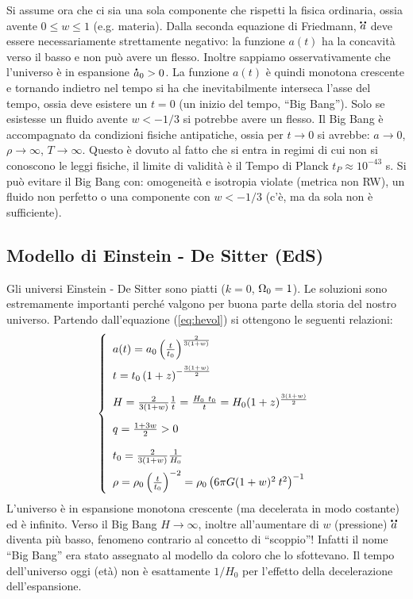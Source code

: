 Si assume ora che ci sia una sola componente che rispetti la fisica ordinaria, ossia avente $0\leq w \leq 1$ (e.g. materia). Dalla seconda equazione di Friedmann, $\accentset{\mbox{\large\bfseries ..}}{a}$ deve essere necessariamente strettamente negativo: la funzione $a(t)$ ha la concavità verso il basso e non può avere un flesso. Inoltre sappiamo osservativamente che l'universo è in espansione $\accentset{\mbox{\large\bfseries .}}{a}_0>0$. La funzione $a(t)$ è quindi monotona crescente e tornando indietro nel tempo si ha che inevitabilmente interseca l'asse del tempo, ossia deve esistere un $t=0$ (un inizio del tempo, ``Big Bang''). Solo se esistesse un fluido avente $w<-1/3$ si potrebbe avere un flesso.  Il Big Bang è accompagnato da condizioni fisiche antipatiche, ossia per $t\rightarrow 0$ si avrebbe: $a\rightarrow 0$, $\rho \rightarrow \infty$, $T \rightarrow \infty$. Questo è dovuto al fatto che si entra in regimi di cui non si conoscono le leggi fisiche, il limite di validità è il Tempo di Planck $t_P \approx 10^{-43}$ s. Si può evitare il Big Bang con: omogeneità e isotropia violate (metrica non RW), un fluido non perfetto o una componente con $w<-1/3$ (c'è, ma da sola non è sufficiente).

\subsection{Modello di Einstein - De Sitter (EdS)}\label{6:chsub:eds}
Gli universi Einstein - De Sitter sono piatti ($k=0$, $\Omega_0 =1$). Le soluzioni sono estremamente importanti perché valgono per buona parte della storia del nostro universo. Partendo dall'equazione (\ref{eq:hevol}) si ottengono le seguenti relazioni:
\begin{equation}\left\{
    \def\arraystretch{2}
        \begin{array}{ll}
            a(t) = a_0 \left ( \frac{t}{t_0} \right )^{\frac{2}{3(1+w)}} \\
            t = t_0 \left ( 1+z \right )^{-\frac{3(1+w)}{2}} \\
            H = \frac{2}{3(1+w)}\frac{1}{t}=\frac{H_0 ~t_0}{t}=H_0 (1+z)^{\frac{3(1+w)}{2}} \\
            q = \frac{1+3w}{2} > 0 \\
            t_0 = \frac{2}{3(1+w)}\frac{1}{H_0} \\
            \rho  = \rho_0 \left ( \frac{t}{t_0} \right )^{-2}= \rho_0 \left(6\pi G (1+w)^2\: t^2\right)^{-1}
    \end{array}\right. \label{eq:modelloeds}
\end{equation}
L'universo è in espansione monotona crescente (ma decelerata in modo costante) ed è infinito. Verso il Big Bang $H\rightarrow \infty$, inoltre all'aumentare di $w$ (pressione) $\accentset{\mbox{\large\bfseries ..}}{a}$ diventa più basso, fenomeno contrario al concetto di ``scoppio''! Infatti il nome ``Big Bang'' era stato assegnato al modello da coloro che lo sfottevano. Il tempo dell'universo oggi (età) non è esattamente $1/H_0$ per l'effetto della decelerazione dell'espansione.


